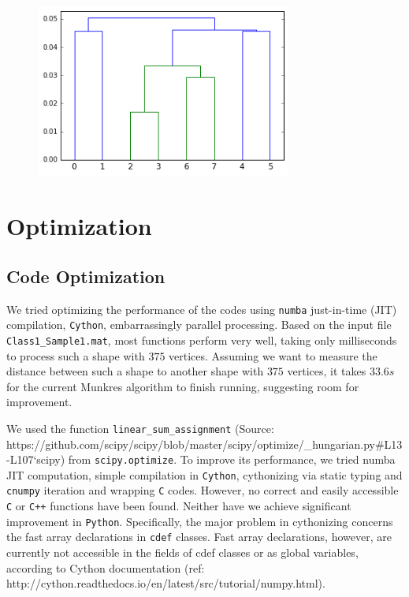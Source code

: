 \documentclass[codesnippet]{jss}
\begin{document}
\begin{figure}
\centering
\includegraphics[width = 0.75\textwidth]{../real_dendogram.png}
\caption{\label{dendogram}}
\end{figure}

\section[optimization]{Optimization}
\subsection{Code Optimization}
We tried optimizing the performance of the codes using \texttt{numba} just-in-time (JIT) compilation, \texttt{Cython}, embarrassingly parallel processing. Based on the input file \texttt{Class1\_Sample1.mat}, most functions perform very well, taking only milliseconds to process such a shape with $375$ vertices. Assuming we want to measure the distance between such a shape to another shape with $375$ vertices, it takes $33.6s$ for the current Munkres algorithm to finish running, suggesting room for improvement.

We used the function \texttt{linear\_sum\_assignment} (Source: https://github.com/scipy/scipy/blob/master/scipy/optimize/\_hungarian.py\#L13-L107`scipy) from \texttt{scipy.optimize}. To improve its performance, we tried numba JIT computation, simple compilation in \texttt{Cython}, cythonizing via static typing and \texttt{cnumpy} iteration and wrapping \texttt{C} codes. However, no correct and easily accessible \texttt{C} or \texttt{C++} functions have been found. Neither have we achieve significant improvement in \texttt{Python}. Specifically, the major problem in cythonizing concerns the fast array declarations in \texttt{cdef} classes. Fast array declarations, however, are currently not accessible in the fields of cdef classes or as global variables, according to Cython documentation
(ref: http://cython.readthedocs.io/en/latest/src/tutorial/numpy.html).
\end{document}
